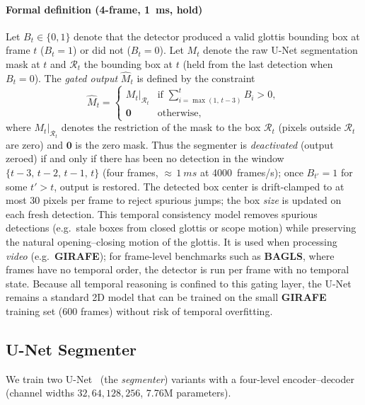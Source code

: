 \documentclass[preprint,12pt]{elsarticle}
\newcommand{\girafe}{\textbf{GIRAFE}}
\newcommand{\bagls}{\textbf{BAGLS}}
\begin{document}
\paragraph{Formal definition (4-frame, \SI{1}{ms}, hold)}
Let $B_t \in \{0,1\}$ denote that the detector produced a valid glottis
bounding box at frame $t$ ($B_t=1$) or did not ($B_t=0$).
Let $M_t$ denote the raw U-Net segmentation mask at $t$ and
$\mathcal{R}_t$ the bounding box at $t$ (held from the last detection when
$B_t=0$).
The \emph{gated output} $\widehat{M}_t$ is defined by the constraint
\begin{equation}
  \widehat{M}_t =
  \begin{cases}
    M_t \big|_{\mathcal{R}_t} & \text{if } \sum_{i=\max(1,\,t-3)}^{t} B_i > 0, \\
    \mathbf{0} & \text{otherwise},
  \end{cases}
\end{equation}
where $M_t|_{\mathcal{R}_t}$ denotes the restriction of the mask to the
box $\mathcal{R}_t$ (pixels outside $\mathcal{R}_t$ are zero) and
$\mathbf{0}$ is the zero mask.
Thus the segmenter is \emph{deactivated} (output zeroed) if and only if
there has been no detection in the window $\{t-3,\,t-2,\,t-1,\,t\}$ (four
frames, $\approx\,\SI{1}{ms}$ at \SI{4000}{frames/s}); once
$B_{t'}=1$ for some $t'>t$, output is restored.
The detected box center is drift-clamped to at most \num{30} pixels per
frame to reject spurious jumps; the box \emph{size} is updated on each
fresh detection.
This temporal consistency model removes spurious detections (e.g.\ stale
boxes from closed glottis or scope motion) while preserving the natural
opening--closing motion of the glottis.
It is used when processing \emph{video} (e.g.\ \girafe{}); for frame-level
benchmarks such as \bagls{}, where frames have no temporal order, the
detector is run per frame with no temporal state.
Because all temporal reasoning is confined to this gating layer, the
U-Net remains a standard 2D model that can be trained on the small
\girafe{} training set (\num{600} frames) without risk of temporal
overfitting.
\label{sec:temporal_detector}

\subsection{U-Net Segmenter}
\label{sec:unet}

We train two U-Net~\cite{ronneberger2015unet} (the \emph{segmenter}) variants with a four-level
encoder--decoder (channel widths \(32, 64, 128, 256\), \num{7.76}M
parameters).
\end{document}

